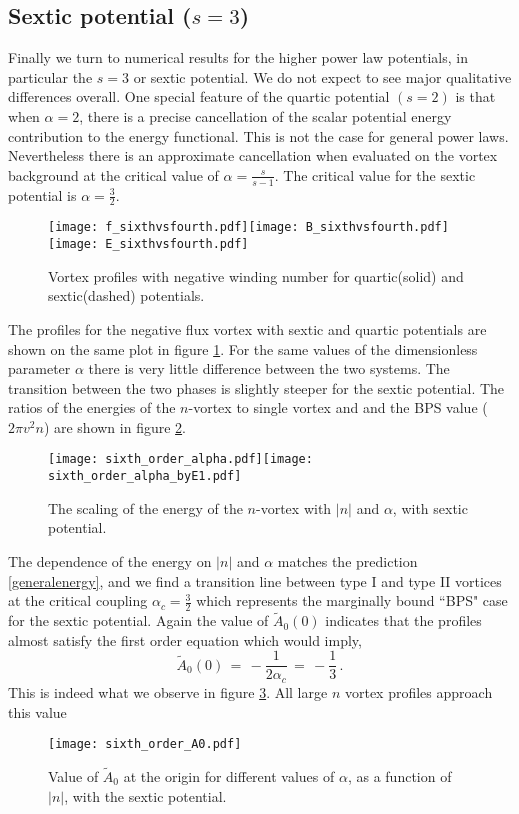 \documentclass[12pt,a4paper]{article}
\def\be{\begin{equation}}
\def\ee{\end{equation}}
\begin{document}
\subsection{Sextic potential ($s=3$)}
Finally we turn to numerical results for the higher power law potentials, in particular the $s=3$
or sextic potential. We do not expect to see major qualitative differences overall. One special feature of the quartic potential $(s=2)$ is that when $\alpha=2$, there is a precise cancellation of the scalar potential energy contribution to the energy functional. This is not the case for general power laws. Nevertheless there is an approximate cancellation when evaluated on the vortex background at the critical value of $\alpha = \frac{s}{s-1}$.   The critical value for the sextic potential is $\alpha = \frac32$.
\begin{figure}[h]
\begin{center}
 \texttt{[image: f\_sixthvsfourth.pdf]}\texttt{[image: B\_sixthvsfourth.pdf]}
 \texttt{[image: E\_sixthvsfourth.pdf]}
     \caption{{ \small Vortex profiles with negative winding number for quartic(solid) and sextic(dashed) potentials.}} \label{sexticprofile}
    \end{center}
\end{figure}
The profiles for the negative flux vortex with sextic and quartic potentials are shown on the same plot in figure \ref{sexticprofile}. For the same values of the dimensionless parameter $\alpha$ there is very little difference between the two systems. The transition between the two phases is slightly steeper for the sextic potential. The ratios of the energies of the $n$-vortex to single vortex and and the BPS value ($2\pi v^2 n$) are shown in figure 
\ref{sexticenergy}.
 \begin{figure}[h]
\begin{center}
 \texttt{[image: sixth\_order\_alpha.pdf]}\hspace{0.1in}\texttt{[image: sixth\_order\_alpha\_byE1.pdf]}
     \caption{{ \small The scaling of the energy of the $n$-vortex with $|n|$ and $\alpha$, with sextic potential.}} \label{sexticenergy}
    \end{center}
\end{figure}
The dependence of the energy on $|n|$ and $\alpha$ matches the prediction \eqref{generalenergy}, and we find a transition line between type I and type II vortices at the critical coupling $\alpha_c = \tfrac32$ which represents the marginally bound ``BPS" case for the sextic potential.   Again the value of $\tilde A_0(0)$ indicates that the profiles almost satisfy the first order equation which would imply,
\be
\tilde A_0(0)\,=\,-\frac{1}{2\alpha_c}\,=\,-\frac13\,.
\ee
This is indeed what we observe in figure \ref{A0sextic}. All large $n$ vortex profiles approach this value
\begin{figure}[h]
\begin{center}
 \texttt{[image: sixth\_order\_A0.pdf]}     \caption{{ \small Value of $\tilde A_0$ at the origin for different values of $\alpha$, as a function of $|n|$,  
 with the sextic potential.}} \label{A0sextic}
    \end{center}
\end{figure}
\end{document}
